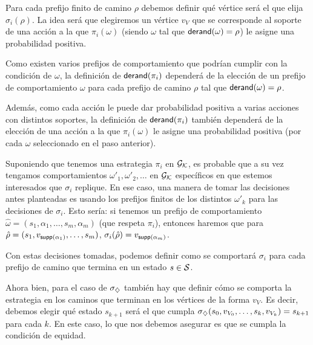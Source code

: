 Para cada prefijo finito de camino $\rho$ debemos definir qué vértice será el
que elija $\sigma_i(\rho)$. La idea será que elegiremos un vértice $v_V$ que se
corresponde al soporte de una acción a la que $\pi_i(\omega)$ (siendo $\omega$
tal que $\textsf{derand}(\omega) = \rho$) le asigne una probabilidad positiva.

Como existen varios prefijos de comportamiento que podrían cumplir con la
condición de $\omega$, la definición de $\textsf{derand}(\pi_i)$ dependerá de la
elección de un prefijo de comportamiento $\omega$ para cada prefijo de camino
$\rho$ tal que $\textsf{derand}(\omega) = \rho$.

Además, como cada acción le puede dar probabilidad positiva a varias acciones
con distintos soportes, la definición de $\textsf{derand}(\pi_i)$ también dependerá de
la elección de una acción a la que $\pi_i(\omega)$ le asigne una probabilidad
positiva (por cada $\omega$ seleccionado en el paso anterior).

\begin{boxgris}{}
	Suponiendo que tenemos una estrategia $\pi_i$ en $\mathcal{G}_{\mathcal{K}}$, es probable que a su vez tengamos comportamientos $\omega'_1, \omega'_2, \dots$ en $\mathcal{G}_{\mathcal{K}}$ específicos en que estemos interesados que $\sigma_i$ replique. En ese caso, una manera de tomar las decisiones antes planteadas es usando los prefijos finitos de los distintos $\omega'_k$ para las decisiones de $\sigma_i$. Esto sería: si tenemos un prefijo de comportamiento $\hat \omega = (s_1, \alpha_1, \dots, s_m, \alpha_m)$ (que respeta $\pi_i$), entonces haremos que para $\hat \rho = (s_1, v_{\textsf{supp}(\alpha_1)}, \dots, s_m)$, $\sigma_i(\hat \rho) = v_{\textsf{supp}(\alpha_m)}$.
\end{boxgris}

Con estas decisiones tomadas, podemos definir como se comportará $\sigma_i$
para cada prefijo de camino que termina en un estado $s \in \mathcal{S}$.

Ahora bien, para el caso de $\sigma_\diamondsuit$ también hay que definir cómo se
comporta la estrategia en los caminos que terminan en los vértices de la forma
$v_V$. Es decir, debemos elegir qué estado $s_{k+1}$ será el que cumpla
$\sigma_\diamondsuit(s_0, v_{V_0}, \dots, s_k, v_{V_k}) = s_{k+1}$ para cada $k$. En
este caso, lo que nos debemos asegurar es que se cumpla la condición de
equidad.

